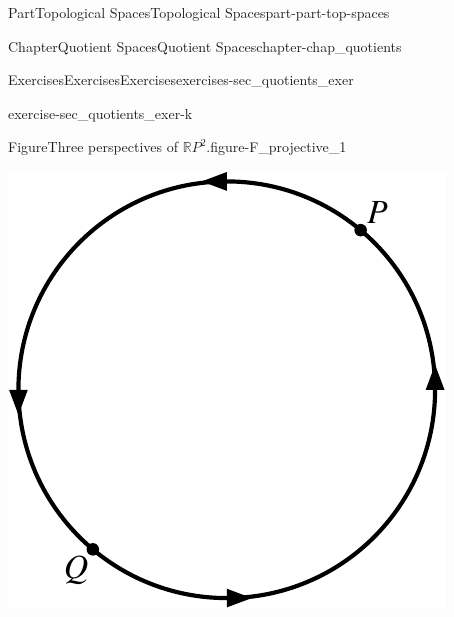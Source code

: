 \documentclass[oneside,10pt,]{book}
\numberwithin{equation}{chapter}
\begin{document}
\begin{partptx}{Part}{Topological Spaces}{}{Topological Spaces}{}{}{part-part-top-spaces}
\begin{chapterptx}{Chapter}{Quotient Spaces}{}{Quotient Spaces}{}{}{chapter-chap_quotients}
\begin{exercises-section}{Exercises}{Exercises}{}{Exercises}{}{}{exercises-sec_quotients_exer}
\begin{divisionexercise}{10}{}{}{exercise-sec_quotients_exer-k}
\begin{enumerate}[font=\bfseries,label=(\alph*),ref=\alph*]
\begin{figureptx}{Figure}{Three perspectives of \(\mathbb{R}P^2\).}{figure-F_projective_1}{}
\begin{sidebyside}{3}{0}{0}{0}
\begin{sbspanel}{0.3}
\includegraphics[width=\linewidth]{external/Projective_disk.pdf}
\end{sbspanel}%
\begin{sbspanel}{0.3}%

\end{sbspanel}
\end{sidebyside}
\end{figureptx}
\end{enumerate}
\end{divisionexercise}
\end{exercises-section}
\end{chapterptx}
\end{partptx}
\end{document}
